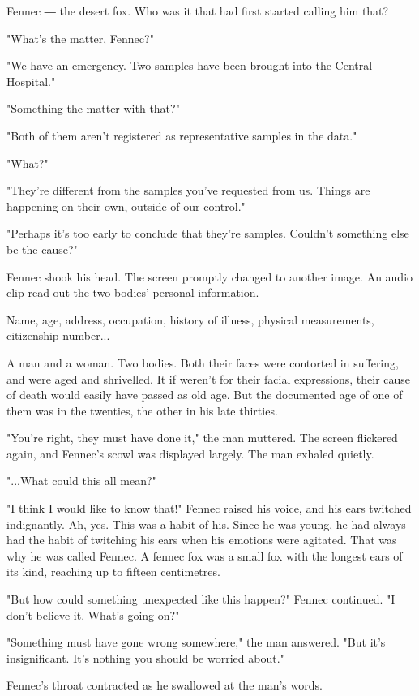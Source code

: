 Fennec ― the desert fox. Who was it that had first started calling him
that?

"What's the matter, Fennec?"

"We have an emergency. Two samples have been brought into the Central
Hospital."

"Something the matter with that?"

"Both of them aren't registered as representative samples in the data."

"What?"

"They're different from the samples you've requested from us. Things are
happening on their own, outside of our control."

"Perhaps it's too early to conclude that they're samples. Couldn't
something else be the cause?"

Fennec shook his head. The screen promptly changed to another image. An
audio clip read out the two bodies' personal information.

Name, age, address, occupation, history of illness, physical
measurements, citizenship number...

A man and a woman. Two bodies. Both their faces were contorted in
suffering, and were aged and shrivelled. It if weren't for their facial
expressions, their cause of death would easily have passed as old age.
But the documented age of one of them was in the twenties, the other in
his late thirties.

"You're right, they must have done it," the man muttered. The screen
flickered again, and Fennec's scowl was displayed largely. The man
exhaled quietly.

"...What could this all mean?"

"I think I would like to know that!" Fennec raised his voice, and his
ears twitched indignantly. Ah, yes. This was a habit of his. Since he
was young, he had always had the habit of twitching his ears when his
emotions were agitated. That was why he was called Fennec. A fennec fox
was a small fox with the longest ears of its kind, reaching up to
fifteen centimetres.

"But how could something unexpected like this happen?" Fennec continued.
"I don't believe it. What's going on?"

"Something must have gone wrong somewhere," the man answered. "But it's
insignificant. It's nothing you should be worried about."

Fennec's throat contracted as he swallowed at the man's words.

